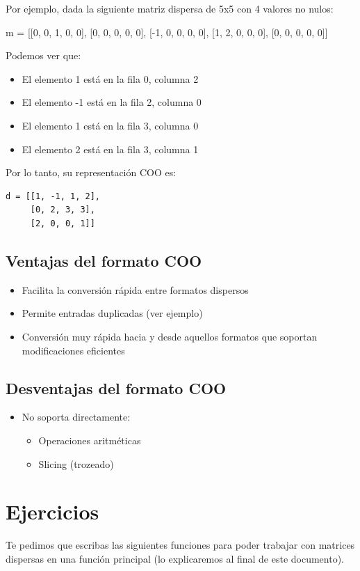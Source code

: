 \documentclass[10pt,a4paper]{article}
\begin{document}
Por ejemplo, dada la siguiente matriz dispersa de 5x5 con 4 valores no nulos:

\begin{attachedlisting}[sparse1]
m = [[0, 0, 1, 0, 0],
     [0, 0, 0, 0, 0],
     [-1, 0, 0, 0, 0],
     [1, 2, 0, 0, 0],
     [0, 0, 0, 0, 0]]
\end{attachedlisting}

Podemos ver que:
\begin{itemize}
\item El elemento 1 está en la fila 0, columna 2
\item El elemento -1 está en la fila 2, columna 0
\item El elemento 1 está en la fila 3, columna 0
\item El elemento 2 está en la fila 3, columna 1
\end{itemize}

Por lo tanto, su representación COO es:

\begin{lstlisting}
d = [[1, -1, 1, 2],
     [0, 2, 3, 3],
     [2, 0, 0, 1]]
\end{lstlisting}

\subsection*{Ventajas del formato COO}
\begin{itemize}
\item Facilita la conversión rápida entre formatos dispersos
\item Permite entradas duplicadas (ver ejemplo)
\item Conversión muy rápida hacia y desde aquellos formatos que soportan modificaciones eficientes
\end{itemize}

\subsection*{Desventajas del formato COO}
\begin{itemize}
\item No soporta directamente:
\begin{itemize}
    \item Operaciones aritméticas
    \item Slicing (trozeado)
\end{itemize}
\end{itemize}

\section*{Ejercicios}
Te pedimos que escribas las siguientes funciones para poder trabajar con matrices dispersas en una función principal (lo explicaremos al final de este documento).
\end{document}
